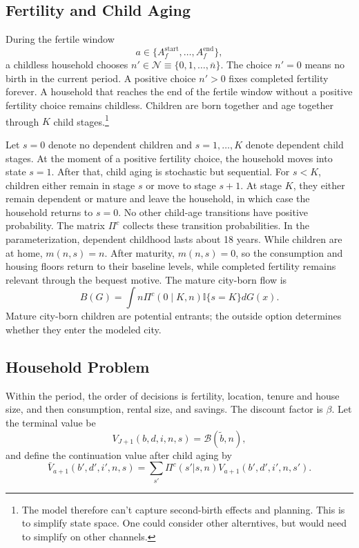 \documentclass[11pt]{article}
\newcommand{\ind}{\mathbb{I}}
\newcommand{\Nset}{\mathcal N}
\begin{document}
\subsection{Fertility and Child Aging}
During the fertile window
\begin{equation*}
    a\in\{A_f^{\mathrm{start}},\ldots,A_f^{\mathrm{end}}\},
\end{equation*}
a childless household chooses $n'\in\Nset\equiv\{0,1,\ldots,\bar n\}$.
The choice $n'=0$ means no birth in the current period. A positive choice $n'>0$ fixes completed fertility forever. A household that reaches the end of the fertile window without a positive fertility choice remains childless. Children are born together and age together through $K$ child stages.\footnote{The model therefore can't capture second-birth effects and planning. This is to simplify state space. One could consider other alterntives, but would need to simplify on other channels.}

Let $s=0$ denote no dependent children and $s=1,\ldots,K$ denote dependent child stages. At the moment of a positive fertility choice, the household moves into state $s=1$. After that, child aging is stochastic but sequential. For $s<K$, children either remain in stage $s$ or move to stage $s+1$. At stage $K$, they either remain dependent or mature and leave the household, in which case the household returns to $s=0$. No other child-age transitions have positive probability. The matrix $\Pi^c$ collects these transition probabilities. In the parameterization, dependent childhood lasts about 18 years. While children are at home, $m(n,s)=n$. After maturity, $m(n,s)=0$, so the consumption and housing floors return to their baseline levels, while completed fertility remains relevant through the bequest motive. The mature city-born flow is
\begin{equation}
    B(G)
    =
    \int
    n\Pi^c(0\mid K,n)\ind\{s=K\}dG(x).
    \label{eq:mature_cityborn_flow}
\end{equation}
Mature city-born children are potential entrants; the outside option determines whether they enter the modeled city.

\subsection{Household Problem}

Within the period, the order of decisions is fertility, location, tenure and house size, and then consumption, rental size, and savings. The discount factor is $\beta$. Let the terminal value be
\begin{equation*}
    V_{J+1}(b,d,i,n,s)=\mathcal B(\widetilde b,n),
\end{equation*}
and define the continuation value after child aging by
\begin{equation*}
    \bar V_{a+1}(b',d',i',n,s)
    =
    \sum_{s'}\Pi^c(s'|s,n)V_{a+1}(b',d',i',n,s').
\end{equation*}
\end{document}
